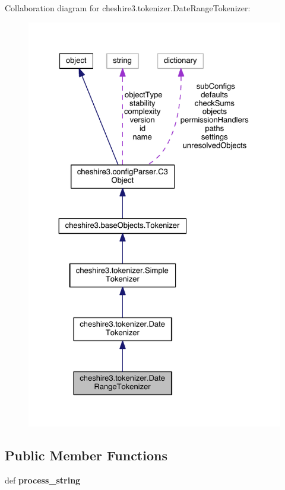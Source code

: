 Collaboration diagram for cheshire3.\-tokenizer.\-Date\-Range\-Tokenizer\-:
\nopagebreak
\begin{figure}[H]
\begin{center}
\leavevmode
\includegraphics[width=326pt]{classcheshire3_1_1tokenizer_1_1_date_range_tokenizer__coll__graph}
\end{center}
\end{figure}
\subsection*{Public Member Functions}
\begin{DoxyCompactItemize}
\item 
\hypertarget{classcheshire3_1_1tokenizer_1_1_date_range_tokenizer_af0c6803068821ec35de4302944ba2507}{def {\bfseries process\-\_\-string}}\label{classcheshire3_1_1tokenizer_1_1_date_range_tokenizer_af0c6803068821ec35de4302944ba2507}

\end{DoxyCompactItemize}

